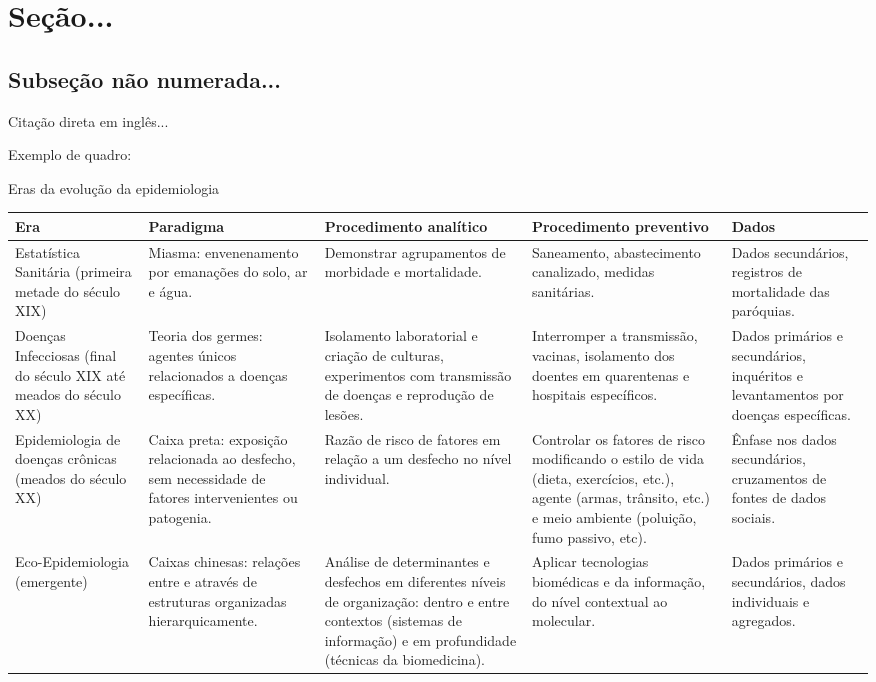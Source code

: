 \documentclass[
	12pt,				  %
	openright,	  %
	oneside,			%
	a4paper,			%
	english,			%
	french,				%
	spanish,			%
	brazil				%
	]{abntex2}
\begin{document}
\section{Seção...}



\subsection*{Subseção não numerada...}

\begin{citacao}[english]
Citação direta em inglês...
\end{citacao}

Exemplo de quadro:

\newpage
\begin{landscape}
\begin{quadro}[h!]
\caption{\label{quadro:eras_epidemiologia} Eras da evolução da epidemiologia}
\small
\begin{tabular}{|p{5cm}|p{4.2cm}|p{4.2cm}|p{4.2cm}|p{4.2cm}|}
\hline 
Era & Paradigma & Procedimento analítico & Procedimento preventivo & Dados \\ 
\hline 
Estatística Sanitária (primeira metade do século XIX) & Miasma: envenenamento por emanações do solo, ar e água. & Demonstrar agrupamentos de morbidade e mortalidade. & Saneamento, abastecimento canalizado, medidas sanitárias. & Dados secundários, registros de mortalidade das paróquias. \\ 
\hline 
Doenças Infecciosas (final do século XIX até meados do século XX) & Teoria dos germes: agentes únicos relacionados a doenças específicas. & Isolamento laboratorial e criação de culturas, experimentos com transmissão de doenças e reprodução de lesões. & Interromper a transmissão, vacinas, isolamento dos doentes em quarentenas e hospitais específicos. & Dados primários e secundários, inquéritos e levantamentos por doenças específicas. \\ 
\hline 
Epidemiologia de doenças crônicas (meados do século XX) & Caixa preta: exposição relacionada ao desfecho, sem necessidade de fatores intervenientes ou patogenia. & Razão de risco de fatores em relação a um desfecho no nível individual. & Controlar os fatores de risco modificando o estilo de vida (dieta, exercícios, etc.), agente (armas, trânsito, etc.) e meio ambiente (poluição, fumo passivo, etc). & Ênfase nos dados secundários, cruzamentos de fontes de dados sociais. \\ 
\hline 
Eco-Epidemiologia (emergente) & Caixas chinesas: relações entre e através de estruturas organizadas hierarquicamente. & Análise de determinantes e desfechos em diferentes níveis de organização: dentro e entre contextos (sistemas de informação) e em profundidade (técnicas da biomedicina). & Aplicar tecnologias biomédicas e da informação, do nível contextual ao molecular. & Dados primários e secundários, dados individuais e agregados. \\ 

\end{tabular}
\end{quadro}
\end{landscape}
\end{document}
